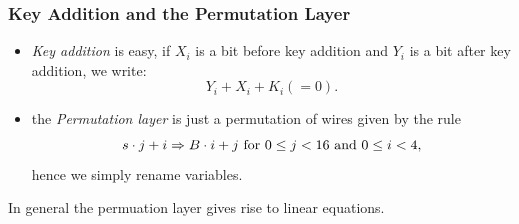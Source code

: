 \documentclass[9pt]{beamer}
\begin{document}
\begin{frame}
\frametitle{Key Addition and the Permutation Layer}

\begin{itemize}
  \item \emph{Key addition} is easy, if $X_i$ is a bit before key addition and $Y_i$ is a bit after key addition, we write:
\[Y_i + X_i + K_i (=0).\]
  \item the \emph{Permutation layer} is just a permutation of wires given by the rule
\[s \cdot j + i \Rightarrow  B \cdot i + j \textnormal{ for } 0 \leq j < 16 \textnormal{ and } 0 \leq i < 4,\] hence we simply rename variables.
\end{itemize}

\begin{block}{}
In general the permuation layer gives rise to linear equations. 
\end{block}


\end{frame}
\end{document}
